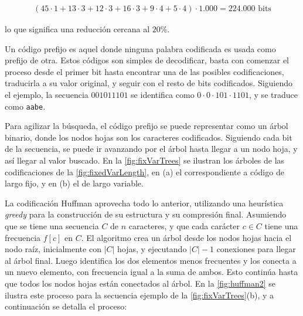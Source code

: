 \begin{align*}
	(45 \cdot 1 + 13 \cdot 3 + 12 \cdot 3 + 16 \cdot 3 + 9 \cdot 4 + 5 \cdot 4) \cdot \textrm{1.000} = \textrm{224.000 bits}
\end{align*}

\noindent lo que significa una reducción cercana al $20\%$. 

Un código prefijo es aquel donde ninguna palabra codificada es usada como prefijo de otra. Estos códigos son simples de decodificar, basta con comenzar el proceso desde el primer bit hasta encontrar una de las posibles codificaciones, traducirla a su valor original, y seguir con el resto de bits codificados. Siguiendo el ejemplo, la secuencia $001011101$ se identifica como $0 \cdot 0 \cdot 101 \cdot 1101$, y se traduce como \texttt{aabe}.

Para agilizar la búsqueda, el código prefijo se puede representar como un árbol binario, donde los nodos hojas son los caracteres codificados. Siguiendo cada bit de la secuencia, se puede ir avanzando por el árbol hasta llegar a un nodo hoja, y así llegar al valor buscado. En la \autoref{fig:fixVarTrees} se ilustran los árboles de las codificaciones de la \autoref{fig:fixedVarLength}, en (a) el correspondiente a código de largo fijo, y en (b) el de largo variable.





La codificación Huffman aprovecha todo lo anterior, utilizando una heurística \textit{greedy} para la construcción de su estructura y su compresión final. Asumiendo que se tiene una secuencia $C$ de $n$ caracteres, y que cada carácter $c \in C$ tiene una frecuencia $f[c]$ en $C$. El algoritmo crea un árbol desde los nodos hojas hacia el nodo raíz, inicialmente con $|C|$ hojas, y ejecutando $|C| - 1$ conexiones para llegar al árbol final. Luego identifica los dos elementos menos frecuentes y los conecta a un nuevo elemento, con frecuencia igual a la suma de ambos. Esto continúa hasta que todos los nodos hojas están conectados al árbol. En la \autoref{fig:huffman2} se ilustra este proceso para la secuencia ejemplo de la \autoref{fig:fixVarTrees}(b), y a continuación se detalla el proceso:

